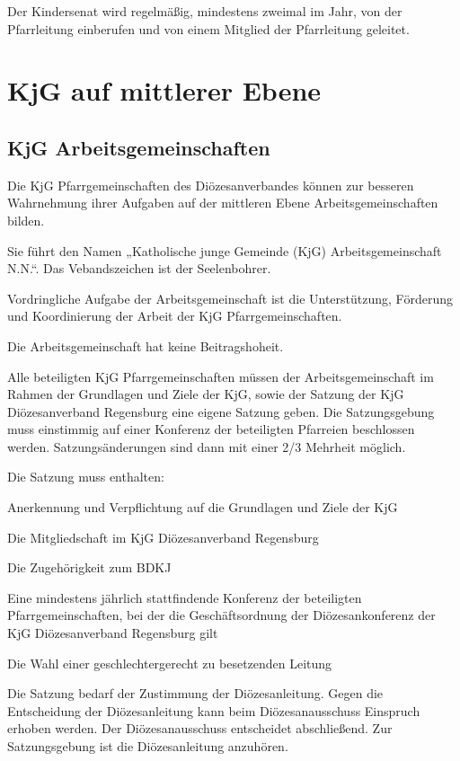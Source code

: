 \documentclass[12pt]{report}
\begin{document}
\begin{flushleft}
Der Kindersenat wird regelmäßig, mindestens zweimal im Jahr, von der Pfarrleitung einberufen
und von einem Mitglied der Pfarrleitung geleitet.

\chapter{KjG auf mittlerer Ebene}

\section{KjG Arbeitsgemeinschaften}

Die KjG Pfarrgemeinschaften des Diözesanverbandes können zur besseren Wahrnehmung ihrer
Aufgaben auf der mittleren Ebene Arbeitsgemeinschaften bilden.

Sie führt den Namen „Katholische junge Gemeinde (KjG) Arbeitsgemeinschaft N.N.“.
Das Vebandszeichen ist der Seelenbohrer.

Vordringliche Aufgabe der Arbeitsgemeinschaft ist die Unterstützung, Förderung und Koordinierung
der Arbeit der KjG Pfarrgemeinschaften.

Die Arbeitsgemeinschaft hat keine Beitragshoheit.

Alle beteiligten KjG Pfarrgemeinschaften müssen der Arbeitsgemeinschaft im Rahmen der Grundlagen
und Ziele der KjG, sowie der Satzung der KjG Diözesanverband Regensburg eine eigene
Satzung geben. Die Satzungsgebung muss einstimmig auf einer Konferenz der beteiligten Pfarreien
beschlossen werden. Satzungsänderungen sind dann mit einer 2/3 Mehrheit möglich.

Die Satzung muss enthalten:
\begin{itemize}
  \item Anerkennung und Verpflichtung auf die Grundlagen und Ziele der KjG
  \item Die Mitgliedschaft im KjG Diözesanverband Regensburg
  \item Die Zugehörigkeit zum BDKJ
  \item Eine mindestens jährlich stattfindende Konferenz der beteiligten Pfarrgemeinschaften, bei der
        die Geschäftsordnung der Diözesankonferenz der KjG Diözesanverband Regensburg gilt
  {\color{red}\item Die Wahl einer geschlechtergerecht zu besetzenden Leitung}
\end{itemize}

Die Satzung bedarf der Zustimmung der Diözesanleitung. Gegen die Entscheidung der Diözesanleitung
kann beim Diözesanausschuss Einspruch erhoben werden. Der Diözesanausschuss entscheidet
abschließend. Zur Satzungsgebung ist die Diözesanleitung
anzuhören.


\end{flushleft}
\end{document}
